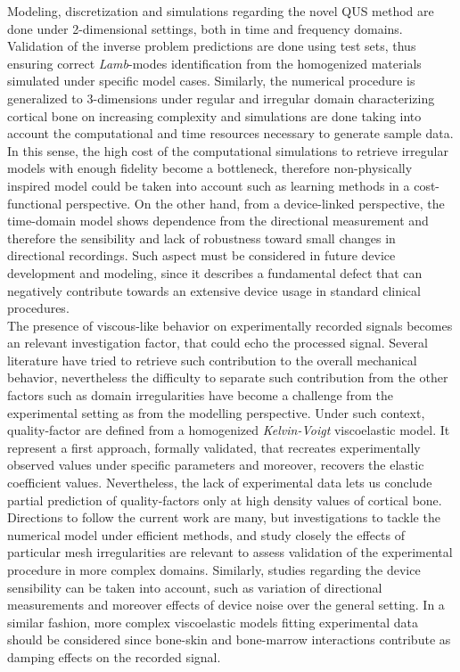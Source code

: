 \begin{conclusion}
Modeling, discretization and simulations regarding the novel QUS method are done under 2-dimensional settings, both in time and frequency domains. Validation of the inverse problem predictions are done using test sets, thus ensuring correct \textit{Lamb}-modes identification from the homogenized materials simulated under specific model cases. Similarly, the numerical procedure is generalized to 3-dimensions under regular and irregular domain characterizing cortical bone on increasing complexity and simulations are done taking into account the computational and time resources necessary to generate sample data. In this sense, the high cost of the computational simulations to retrieve irregular models with enough fidelity become a bottleneck, therefore non-physically inspired model could be taken into account such as learning methods in a cost-functional perspective.
On the other hand, from a device-linked perspective, the time-domain model shows dependence from the directional measurement and therefore the sensibility and lack of robustness toward small changes in directional recordings. Such aspect must be considered in future device development and modeling, since it describes a fundamental defect that can negatively contribute towards an extensive device usage in standard clinical procedures.
\\
\newpage
The presence of viscous-like behavior on experimentally recorded signals becomes an relevant investigation factor, that could echo the processed signal. Several literature have tried to retrieve such contribution to the overall mechanical behavior, nevertheless the difficulty to separate such contribution from the other factors such as domain irregularities have become a challenge from the experimental setting as from the modelling perspective. Under such context, quality-factor are defined from a homogenized \textit{Kelvin-Voigt} viscoelastic model. It represent a first approach, formally validated, that recreates experimentally observed values under specific parameters and moreover, recovers the elastic coefficient values. 
Nevertheless, the lack of experimental data lets us conclude partial prediction of quality-factors only at high density values of cortical bone. 
\\

Directions to follow the current work are many, but investigations to tackle the numerical model under efficient methods, and study closely the effects of particular mesh irregularities are relevant to assess validation of the experimental procedure in more complex domains. Similarly, studies regarding the device sensibility can be taken into account, such as variation of directional measurements and moreover effects of device noise over the general setting. 
In a similar fashion, more complex viscoelastic models fitting experimental data should be considered since bone-skin and bone-marrow interactions contribute as damping effects on the recorded signal.
\end{conclusion}
